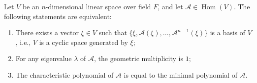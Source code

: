 \documentclass[11pt]{../../TexTemplate/elegantbook} %
\begin{document}
\begin{proposition}
    Let \( V \) be an \( n \)-dimensional linear space over field \( F \),
    and let \( \mathcal{A}\in \operatorname{Hom}(V) \).
    The following statements are equivalent:
    \begin{enumerate}
        \item There exists a vector \( \xi \in V \) such that \(\{ \xi, \mathcal{A}(\xi), \ldots, \mathcal{A}^{n-1}(\xi) \}\) 
            is a basis of \( V \), i.e., \( V \) is a cyclic space generated by \( \xi \);
        \item For any eigenvalue \( \lambda \) of \( \mathcal{A} \),
            the geometric multiplicity is \( 1 \);
        \item The characteristic polynomial of \( \mathcal{A} \) is equal to the minimal polynomial of \( \mathcal{A} \).
    \end{enumerate}
\end{proposition}
\end{document}
